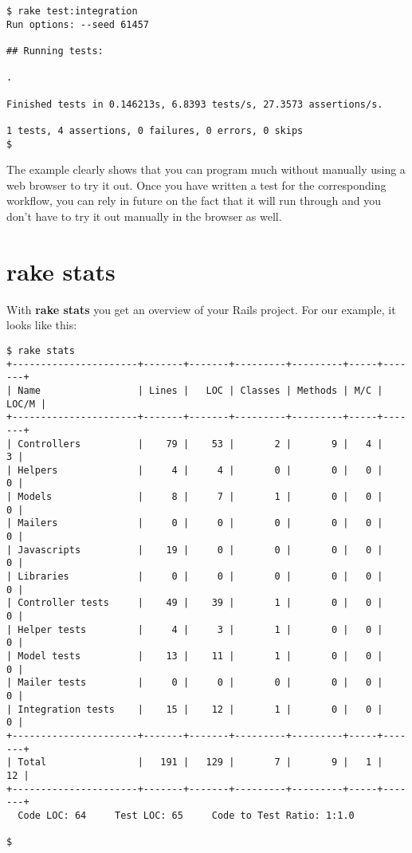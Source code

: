 \documentclass[a4paper]{book}
\begin{document}
\begin{shaded}\begin{verbatim}
$ rake test:integration
Run options: --seed 61457

## Running tests:

.

Finished tests in 0.146213s, 6.8393 tests/s, 27.3573 assertions/s.

1 tests, 4 assertions, 0 failures, 0 errors, 0 skips
$
\end{verbatim}\end{shaded}

The example clearly shows that you can program much without manually using a web browser to try it out. Once you have written a test for the corresponding workflow, you can rely in future on the fact that it will run through and you don't have to try it out manually in the browser as well.

\section{rake stats}\label{rake-stats}

With \textbf{rake stats} you get an overview of your Rails project. For our example, it looks like this:

\begin{shaded}\begin{verbatim}
$ rake stats
+----------------------+-------+-------+---------+---------+-----+-------+
| Name                 | Lines |   LOC | Classes | Methods | M/C | LOC/M |
+----------------------+-------+-------+---------+---------+-----+-------+
| Controllers          |    79 |    53 |       2 |       9 |   4 |     3 |
| Helpers              |     4 |     4 |       0 |       0 |   0 |     0 |
| Models               |     8 |     7 |       1 |       0 |   0 |     0 |
| Mailers              |     0 |     0 |       0 |       0 |   0 |     0 |
| Javascripts          |    19 |     0 |       0 |       0 |   0 |     0 |
| Libraries            |     0 |     0 |       0 |       0 |   0 |     0 |
| Controller tests     |    49 |    39 |       1 |       0 |   0 |     0 |
| Helper tests         |     4 |     3 |       1 |       0 |   0 |     0 |
| Model tests          |    13 |    11 |       1 |       0 |   0 |     0 |
| Mailer tests         |     0 |     0 |       0 |       0 |   0 |     0 |
| Integration tests    |    15 |    12 |       1 |       0 |   0 |     0 |
+----------------------+-------+-------+---------+---------+-----+-------+
| Total                |   191 |   129 |       7 |       9 |   1 |    12 |
+----------------------+-------+-------+---------+---------+-----+-------+
  Code LOC: 64     Test LOC: 65     Code to Test Ratio: 1:1.0

$
\end{verbatim}\end{shaded}
\end{document}
